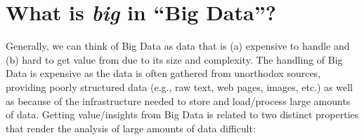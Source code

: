 \documentclass[
  12pt,
]{style/krantz}
\begin{document}

\hypertarget{what-is-big-in-big-data}{%
\chapter{\texorpdfstring{What is \emph{big} in ``Big Data''?}{What is big in ``Big Data''?}}\label{what-is-big-in-big-data}}

Generally, we can think of Big Data as data that is (a) expensive to handle and (b) hard to get value from due to its size and complexity. The handling of Big Data is expensive as the data is often gathered from unorthodox sources, providing poorly structured data (e.g., raw text, web pages, images, etc.) as well as because of the infrastructure needed to store and load/process large amounts of data. Getting value/insights from Big Data is related to two distinct properties that render the analysis of large amounts of data difficult:
\end{document}
